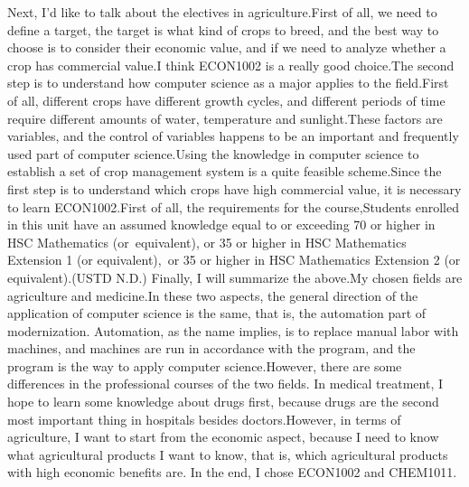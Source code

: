 \documentclass[12pt]{article}
\begin{document}
Next, I'd like to talk about the electives in agriculture.First of all, we need to define a target, the target is what kind of crops to breed, and the best way to choose is to consider their economic value, and if we need to analyze whether a crop has commercial value.I think ECON1002 is a really good choice.The second step is to understand how computer science as a major applies to the field.First of all, different crops have different growth cycles, and different periods of time require different amounts of water, temperature and sunlight.These factors are variables, and the control of variables happens to be an important and frequently used part of computer science.Using the knowledge in computer science to establish a set of crop management system is a quite feasible scheme.Since the first step is to understand which crops have high commercial value, it is necessary to learn ECON1002.First of all, the requirements for the course,Students enrolled in this unit have an assumed knowledge equal to or exceeding 70 or higher in HSC Mathematics (or equivalent), or 35 or higher in HSC Mathematics Extension 1 (or equivalent), or 35 or higher in HSC Mathematics Extension 2 (or equivalent).(USTD N.D.)
Finally, I will summarize the above.My chosen fields are agriculture and medicine.In these two aspects, the general direction of the application of computer science is the same, that is, the automation part of modernization. Automation, as the name implies, is to replace manual labor with machines, and machines are run in accordance with the program, and the program is the way to apply computer science.However, there are some differences in the professional courses of the two fields. In medical treatment, I hope to learn some knowledge about drugs first, because drugs are the second most important thing in hospitals besides doctors.However, in terms of agriculture, I want to start from the economic aspect, because I need to know what agricultural products I want to know, that is, which agricultural products with high economic benefits are. In the end, I chose ECON1002 and CHEM1011.
\end{document}
